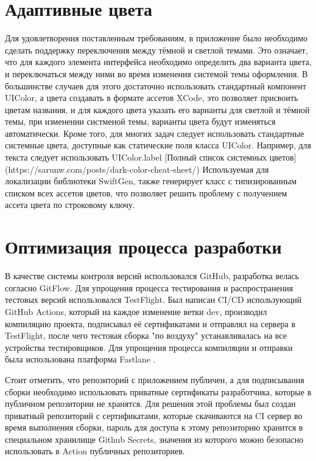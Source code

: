   \section{Адаптивные цвета}
    Для удовлетворения поставленным требованиям, в приложение было необходимо сделать поддержку переключения между тёмной и светлой темами. Это означает, что для каждого элемента интерфейса необходимо определить два варианта цвета, и переключаться между ними во время изменения системой темы оформления. В большинстве случаев для этого достаточно использовать стандартный компонент UIColor, а цвета создавать в формате ассетов XCode, это позволяет присвоить цветам названия, и для каждого цвета указать его варианты для светлой и тёмной темы, при изменении систменой темы, варианты цвета будут изменяться автоматически. Кроме того, для многих задач следует использовать стандартные системные цвета, доступные как статические поля класса UIColor. Например, для текста следует использовать UIColor.label [Полный список системных цветов](https://sarunw.com/posts/dark-color-cheat-sheet/)
    Используемая для локализации библиотеки SwiftGen, также генерирует класс с типизированным списком всех ассетов цветов, что позволяет решить проблему с получением ассета цвета по строковому ключу.

  \section{Оптимизация процесса разработки}
    В качестве системы контроля версий использовался GitHub, разработка велась согласно GitFlow. Для упрощения процесса тестирования и распространения тестовых версий использовался TestFlight. Был написан CI/CD использующий GitHub Actions, который на каждое изменение ветки dev, производил компиляцию проекта, подписывал её сертификатами и отправлял на сервера в TestFlight, после чего тестовая сборка "по воздуху" устанавливалась на все устройства тестировщиков. Для упрощения процесса компиляции и отправки была использована платформа Fastlane \cite{Fastlane}.

    Стоит отметить, что репозиторий с приложением публичен, а для подписывания сборки необходимо использовать приватные сертификаты разработчика, которые в публичном репозитории не хранятся. Для решения этой проблемы был создан приватный репозиторий с сертификатами, которые скачиваются на CI сервер во время выполнения сборки, пароль для доступа к этому репозиторию хранится в специальном хранилище Github Secrets, значения из которого можно безопасно использовать в Action публичных репозиториев.


